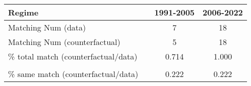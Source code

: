 
\begin{tabular}[t]{lccc}
\toprule
Regime &  & 1991-2005 & 2006-2022\\
\midrule
Matching Num (data) &  & 7 & 18\\
Matching Num (counterfactual) &  & 5 & 18\\
\% total match (counterfactual/data) &  & 0.714 & 1.000\\
 &  &  & \\
\% same match (counterfactual/data) &  & 0.222 & 0.222\\
\bottomrule
\end{tabular}
